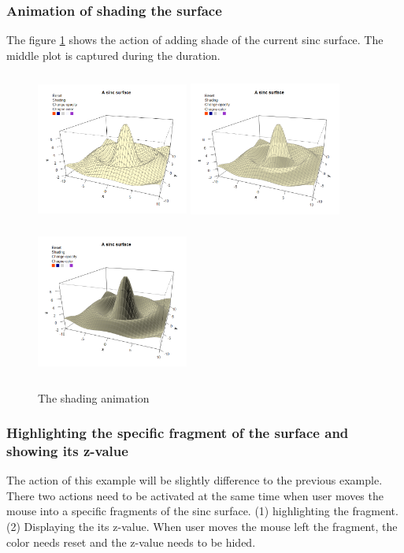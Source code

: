 \documentclass[paper=a4, fontsize=11pt]{report}
\begin{document}
\subsubsection*{Animation of shading the surface}
The figure \ref{Example_6.3.3} shows the action of adding shade of the current sinc surface. The middle plot is captured during the duration.
\begin{figure}[h]
	\begin{center}
		\includegraphics[height = 5cm, width = 5cm]{figure/svg/origin_1.PNG}
		\includegraphics[height = 5cm, width = 5cm]{figure/svg/Shade_2.PNG}
		\includegraphics[height = 5cm, width = 5cm]{figure/svg/Shade_3.PNG}
		\caption{The shading animation}
		\label{Example_6.3.3}
	\end{center}
\end{figure}

\subsubsection*{Highlighting the specific fragment of the surface and showing its z-value}
The action of this example will be slightly difference to the previous example. There two actions need to be activated at the same time when user moves the mouse into a specific fragments of the sinc surface. (1) highlighting the fragment. (2) Displaying the its z-value. When user moves the mouse left the fragment, the color needs reset and the z-value needs to be hided.\\
\end{document}
